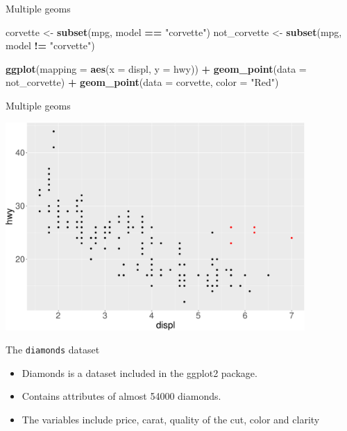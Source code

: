 \documentclass[ignorenonframetext,]{beamer}
\newenvironment{Shaded}{\begin{snugshade}}{\end{snugshade}}
\newcommand{\DataTypeTok}[1]{\textcolor[rgb]{0.13,0.29,0.53}{#1}}
\newcommand{\KeywordTok}[1]{\textcolor[rgb]{0.13,0.29,0.53}{\textbf{#1}}}
\newcommand{\NormalTok}[1]{#1}
\newcommand{\OperatorTok}[1]{\textcolor[rgb]{0.81,0.36,0.00}{\textbf{#1}}}
\newcommand{\StringTok}[1]{\textcolor[rgb]{0.31,0.60,0.02}{#1}}
\begin{document}
\begin{frame}[fragile]{Multiple geoms}
\protect\hypertarget{multiple-geoms-33}{}

\begin{Shaded}
\begin{Highlighting}[]
\NormalTok{corvette <-}\StringTok{ }\KeywordTok{subset}\NormalTok{(mpg, model }\OperatorTok{==}\StringTok{ "corvette"}\NormalTok{)}
\NormalTok{not_corvette <-}\StringTok{ }\KeywordTok{subset}\NormalTok{(mpg, model }\OperatorTok{!=}\StringTok{ "corvette"}\NormalTok{)}

\KeywordTok{ggplot}\NormalTok{(}\DataTypeTok{mapping =} \KeywordTok{aes}\NormalTok{(}\DataTypeTok{x =}\NormalTok{ displ, }\DataTypeTok{y =}\NormalTok{ hwy)) }\OperatorTok{+}\StringTok{ }
\StringTok{  }\KeywordTok{geom_point}\NormalTok{(}\DataTypeTok{data =}\NormalTok{ not_corvette) }\OperatorTok{+}\StringTok{ }
\StringTok{  }\KeywordTok{geom_point}\NormalTok{(}\DataTypeTok{data =}\NormalTok{ corvette,  }\DataTypeTok{color =} \StringTok{"Red"}\NormalTok{)}
\end{Highlighting}
\end{Shaded}

\end{frame}

\begin{frame}{Multiple geoms}
\protect\hypertarget{multiple-geoms-34}{}

\begin{center}\includegraphics[height=300px]{data-visualization_files/figure-beamer/unnamed-chunk-111-1} \end{center}

\end{frame}

\begin{frame}{The \texttt{diamonds} dataset}
\protect\hypertarget{the-diamonds-dataset}{}

\begin{itemize}
\item
  Diamonds is a dataset included in the ggplot2 package.
\item
  Contains attributes of almost 54000 diamonds.
\item
  The variables include price, carat, quality of the cut, color and
  clarity
\end{itemize}

\end{frame}
\end{document}
